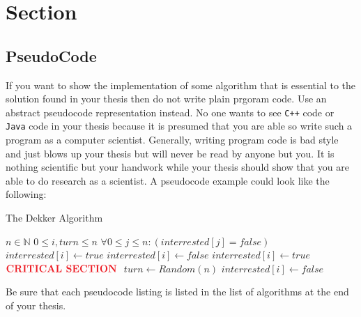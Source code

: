 \documentclass[12pt, a4paper, fleqn]{memoir}%
\begin{document}
\section{Section}
\label{sec:Section}

\subsection{PseudoCode}
\label{sec:PseudoCode}
If you want to show the implementation of some algorithm that is essential to the solution found in your thesis then do not write plain prgoram code. Use an abstract pseudocode representation instead. No one wants to see \texttt{C++\texttrademark} code or \texttt{Java\texttrademark} code in your thesis because it is presumed that you are able so write such a program as a computer scientist. Generally, writing program code is bad style and just blows up your thesis but will never be read by anyone but you. It is nothing scientific but your handwork while your thesis should show that you are able to do research as a scientist. A pseudocode example could look like the following:
\begin{algorithm}[h]
\caption{The Dekker Algorithm}
\label{algo:dekker}
\begin{algorithmic}
\Require $n \in \mathbb{N}$
\Require $0 \leq i,turn \leq n$
\Require $\forall 0 \leq j \leq n : (interrested[j] = false)$
  \State $interrested[i] \leftarrow true$
    \State $interrested[i] \leftarrow false$
    \EndWhile
    \State $interrested[i] \leftarrow true$
  \EndIf 
  \EndWhile
  \State $ $
  \State $\text{\textbf{\color{red}CRITICAL SECTION}}$
  \State $ $
  \State $turn \leftarrow Random(n)$
  \State $interrested[i] \leftarrow false$
\EndProcedure
\end{algorithmic}
\end{algorithm}

Be sure that each pseudocode listing is listed in the list of algorithms at the end of your thesis.


{\small}

\appendix
\appendixpage*
\end{document}

